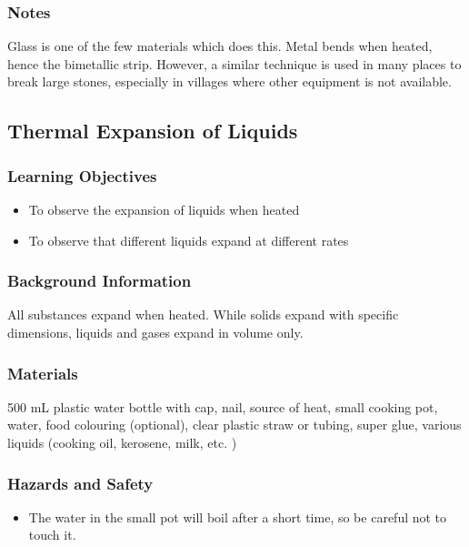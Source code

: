 \subsubsection*{Notes}
Glass is one of the few materials which does this.  Metal bends when heated, hence the bimetallic strip.  However, a similar technique is used in many places to break large stones, especially in villages where other equipment is not available.


\subsection{Thermal Expansion of Liquids}

\subsubsection*{Learning Objectives}
\begin{itemize}
\item{To observe the expansion of liquids when heated} 
\item{To observe that different liquids expand at different rates} 
\end{itemize}

\subsubsection*{Background Information}
All substances expand when heated. While solids expand with specific dimensions, liquids and gases expand in volume only.  

\subsubsection*{Materials}
500 mL plastic water bottle with cap, nail, source of heat, small cooking pot, water, food colouring (optional), clear plastic straw or tubing, super glue, various liquids (cooking oil, kerosene, milk, etc.  )

\subsubsection*{Hazards and Safety}
\begin{itemize}
\item{The water in the small pot will boil after a short time, so be careful not to touch it.} 
\end{itemize}

